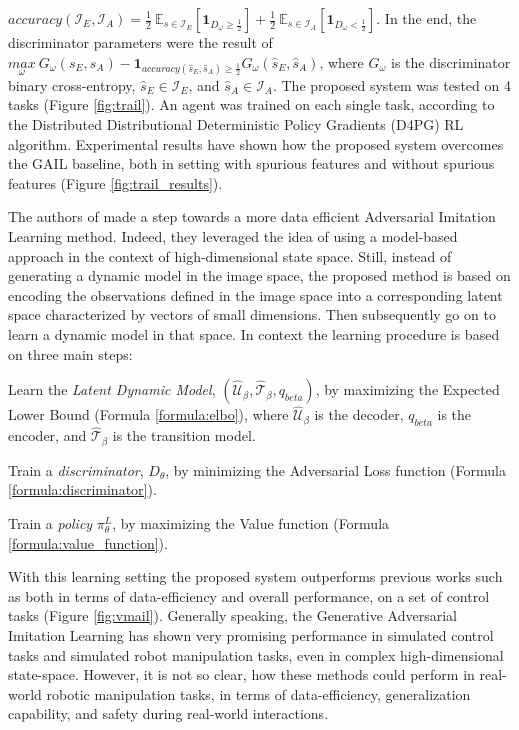 $\textit{accuracy}(\mathcal{I}_{E}, \mathcal{I}_{A}) = \frac{1}{2} \ \mathbb{E}_{s \in \mathcal{I}_{E}} \left[ \mathbf{1}_{D_{\omega} \geq  \frac{1}{2}}\right] + \frac{1}{2} \ \mathbb{E}_{s \in \mathcal{I}_{A}} \left[ \mathbf{1}_{D_{\omega} <  \frac{1}{2}}\right]$. In the end, the discriminator parameters were the result of $\underset{\omega}{max} \ G_{\omega}(s_{E},s_{A}) - \mathbf{1}_{\textit{accuracy}(\hat{s}_{E},\hat{s}_{A}) \geq \frac{1}{2}} G_{\omega}(\hat{s}_{E},\hat{s}_{A})$, where $G_{\omega}$ is the discriminator binary cross-entropy, $\hat{s}_{E} \in \mathcal{I}_{E}$, and $\hat{s}_{A} \in \mathcal{I}_{A}$. The proposed system was tested on 4 tasks (Figure \ref{fig:trail}). An agent was trained on each single task, according to the Distributed Distributional Deterministic Policy Gradients (D4PG) \cite{barth2018d4pg} RL algorithm. Experimental results have shown how the proposed system overcomes the GAIL \cite{ho2016gail} baseline, both in setting with spurious features and without spurious features (Figure \ref{fig:trail_results}). 


\noindent The authors of \cite{rafailov2021visual_ail} made a step towards a more data efficient Adversarial Imitation Learning method. Indeed, they leveraged the idea of using a model-based approach in the context of high-dimensional state space. Still, instead of generating a dynamic model in the image space, the proposed method is based on encoding the observations defined in the image space into a corresponding latent space characterized by vectors of small dimensions. Then subsequently go on to learn a dynamic model in that space. In context the learning procedure is based on three main steps: \begin{enumerate*}[label=\textbf{(\arabic*)}]
    \item Learn the \textit{Latent Dynamic Model}, $(\hat{\mathcal{U}}_{\beta},\hat{\mathcal{T}}_{\beta}, q_{beta})$, by maximizing the Expected Lower Bound (Formula \ref{formula:elbo}), where $\hat{\mathcal{U}}_{\beta}$ is the decoder, $q_{beta}$ is the encoder, and $\hat{\mathcal{T}}_{\beta}$ is the transition model.
    \item Train a \textit{discriminator}, $D_{\theta}$, by minimizing the Adversarial Loss function (Formula \ref{formula:discriminator}).
    \item Train a \textit{policy} $\pi^{L}_{\theta}$, by maximizing the Value function (Formula \ref{formula:value_function}).
\end{enumerate*} 
%

\noindent With this learning setting the proposed system outperforms previous works such as \cite{reddy2019sqil,kostrikov2018discriminator} both in terms of data-efficiency and overall performance, on a set of control tasks (Figure \ref{fig:vmail}).
Generally speaking, the Generative Adversarial Imitation Learning has shown very promising performance in simulated control tasks and simulated robot manipulation tasks, even in complex high-dimensional state-space. However, it is not so clear, how these methods could perform in real-world robotic manipulation tasks, in terms of data-efficiency, generalization capability, and safety during real-world interactions.
